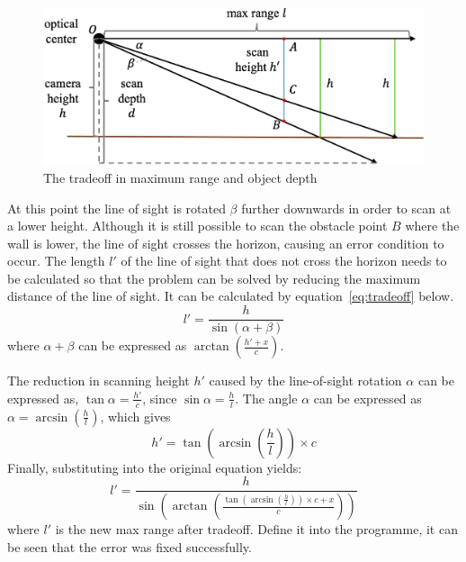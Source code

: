 \begin{figure}[H]
    \centering
    \includegraphics[width=1.0\linewidth]{figs/tradeoff_2.png}
    \caption{The tradeoff in maximum range and object depth}
    \label{fig:tradeoff2}
\end{figure}

At this point the line of sight is rotated $\beta$ further downwards in order to scan at a lower height. 
Although it is still possible to scan the obstacle point $B$ where the wall is lower, 
the line of sight crosses the horizon, causing an error condition to occur. 
The length $l'$ of the line of sight that does not cross the horizon needs to be calculated so that the problem can be solved by reducing the maximum distance of the line of sight. 
It can be calculated by equation~\ref{eq:tradeoff} below.
\begin{equation}
    l'=\frac{h}{\sin{(\alpha+\beta)}}
    \label{eq:tradeoff}
\end{equation}
where $\alpha+\beta$ can be expressed as $\arctan(\frac{h'+x}{c})$. 

The reduction in scanning height $h'$ caused by the line-of-sight rotation $\alpha$ can be expressed as, $\tan\alpha=\frac{h'}{c}
$, since $\sin\alpha=\frac{h}{l}$. The angle $\alpha$ can be expressed as $\alpha=\arcsin(\frac{h}{l})$, which gives
\begin{equation}
    h'=\tan(\arcsin(\frac{h}{l}))\times c
\end{equation}
Finally, substituting into the original equation yields: 
\begin{equation}
    l'=\frac{h}{\sin{(\arctan(\frac{\tan(\arcsin(\frac{h}{l}))\times c+x}{c}))}}
\end{equation}
where $l'$ is the new max range after tradeoff. Define it into the programme, it can be seen that the error was fixed successfully.


